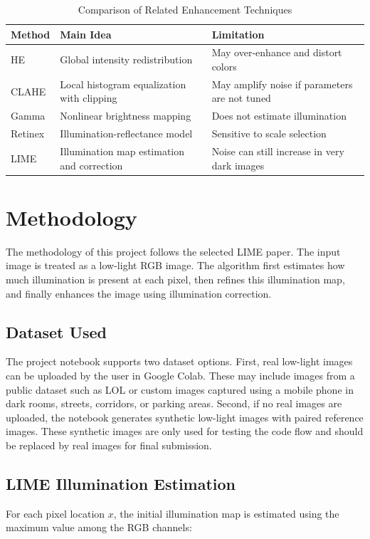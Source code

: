 \documentclass[11pt]{article}
\begin{document}
\begin{table}[htbp]
\caption{Comparison of Related Enhancement Techniques}
\label{tab:literature}
\centering
\begin{tabular}{p{1.8cm} p{2.2cm} p{2.4cm}}
\toprule
\textbf{Method} & \textbf{Main Idea} & \textbf{Limitation} \\
\midrule
HE & Global intensity redistribution & May over-enhance and distort colors \\
CLAHE & Local histogram equalization with clipping & May amplify noise if parameters are not tuned \\
Gamma & Nonlinear brightness mapping & Does not estimate illumination \\
Retinex & Illumination-reflectance model & Sensitive to scale selection \\
LIME & Illumination map estimation and correction & Noise can still increase in very dark images \\
\bottomrule
\end{tabular}
\end{table}

\section{Methodology}
The methodology of this project follows the selected LIME paper. The input image is treated as a low-light RGB image. The algorithm first estimates how much illumination is present at each pixel, then refines this illumination map, and finally enhances the image using illumination correction.

\subsection{Dataset Used}
The project notebook supports two dataset options. First, real low-light images can be uploaded by the user in Google Colab. These may include images from a public dataset such as LOL or custom images captured using a mobile phone in dark rooms, streets, corridors, or parking areas. Second, if no real images are uploaded, the notebook generates synthetic low-light images with paired reference images. These synthetic images are only used for testing the code flow and should be replaced by real images for final submission.

\subsection{LIME Illumination Estimation}
For each pixel location $x$, the initial illumination map is estimated using the maximum value among the RGB channels:
\end{document}
